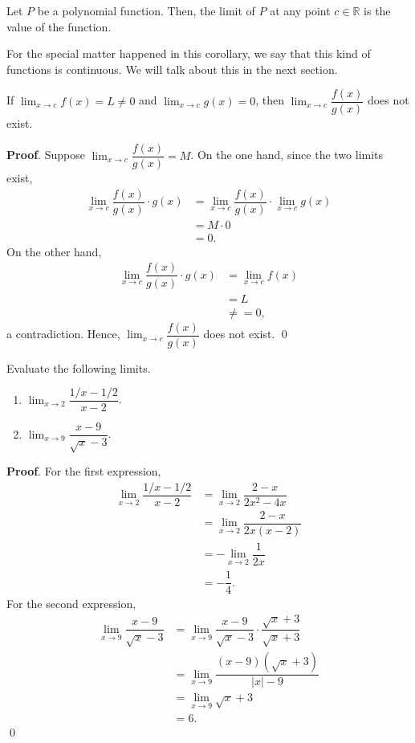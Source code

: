 \documentclass[11pt]{book}
\theoremstyle{break}
\theoremstyle{no_label}
\newcommand{\bbR}{\mathbb{R}}
\numberwithin{equation}{section}
\begin{document}
\begin{corollary}
    Let $P$ be a polynomial function. Then, the limit of $P$ at any point $c\in\bbR$ is the value of the function.
\end{corollary}

For the special matter happened in this corollary, we say that this kind of functions is continuous. We will talk about this in the next section.

\begin{theorem}
    If $\displaystyle\lim_{x\to c}f(x)=L\ne 0$ and $\displaystyle\lim_{x\to c}g(x)=0$, then $\displaystyle\lim_{x\to c}\dfrac{f(x)}{g(x)}$ does not exist.
\end{theorem}
\textbf{Proof}. Suppose $\displaystyle\lim_{x\to c}\dfrac{f(x)}{g(x)}=M$. On the one hand, since the two limits exist, \begin{align*}
    \lim_{x\to c}\dfrac{f(x)}{g(x)}\cdot g(x)&=\lim_{x\to c}\dfrac{f(x)}{g(x)}\cdot\lim_{x\to c}g(x)\\
    &=M\cdot 0\\
    &=0.
\end{align*} On the other hand, \begin{align*}
    \lim_{x\to c}\dfrac{f(x)}{g(x)}\cdot g(x)&=\lim_{x\to c}f(x)\\
    &=L\\
    &\ne=0,
\end{align*} a contradiction. Hence, $\displaystyle\lim_{x\to c}\dfrac{f(x)}{g(x)}$ does not exist. \qed

\begin{example}
    Evaluate the following limits.
    \begin{enumerate}
        \item $\displaystyle\lim_{x\to 2}\dfrac{1/x-1/2}{x-2}$.
        \item $\displaystyle\lim_{x\to 9}\dfrac{x-9}{\sqrt{x}-3}$.
    \end{enumerate}
\end{example}
\textbf{Proof}. For the first expression, \begin{align*}
    \lim_{x\to 2}\dfrac{1/x-1/2}{x-2}&=\lim_{x\to 2}\dfrac{2-x}{2x^2-4x}\\
    &=\lim_{x\to 2}\dfrac{2-x}{2x(x-2)}\\
    &=-\lim_{x\to 2}\dfrac{1}{2x}\\
    &=-\dfrac{1}{4}.
\end{align*} For the second expression, \begin{align*}
    \lim_{x\to 9}\dfrac{x-9}{\sqrt{x}-3}&=\lim_{x\to 9}\dfrac{x-9}{\sqrt{x}-3}\cdot\dfrac{\sqrt{x}+3}{\sqrt{x}+3}\\
    &=\lim_{x\to 9}\dfrac{(x-9)(\sqrt{x}+3)}{|x|-9}\\
    &=\lim_{x\to 9}\sqrt{x}+3\\
    &=6.
\end{align*} \qed
\end{document}
